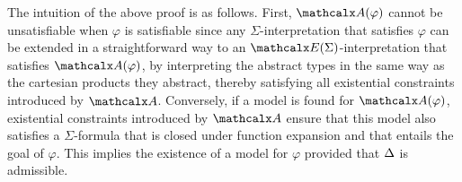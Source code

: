 The intuition of the above proof is as follows.
First, $\conv( \varphi )$ cannot be unsatisfiable when $\varphi$ is satisfiable
since any $\Sigma$-interpretation that satisfies $\varphi$ can be extended in a straightforward way to
an $\extendsig{\Sigma}$-interpretation that satisfies $\conv( \varphi )$, by
interpreting the abstract types in the same way as the cartesian products they
abstract, thereby satisfying all existential constraints introduced by $\conv$.
Conversely, if a model is found for $\conv( \varphi )$,
existential constraints
introduced by $\conv$ ensure that this model also satisfies
a $\Sigma$-formula that is closed under function expansion and
that entails the goal of $\varphi$.
This implies the existence of a model for $\varphi$
provided that $\DDD$ is admissible.

